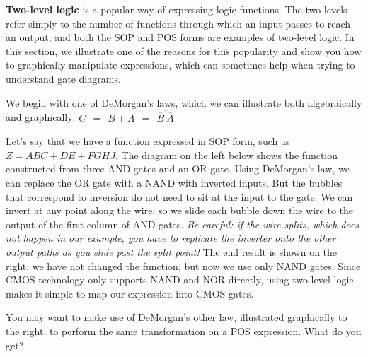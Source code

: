\begin{minipage}{5.3in}
{\bf Two-level logic} is a popular way of expressing logic functions.
The two levels refer simply to the number of functions through which an
input passes to reach an output, and both the SOP and POS forms are 
examples of two-level logic.  In this section, we illustrate one of the 
reasons for this popularity and 
show you how to graphically manipulate
expressions, which can sometimes help when trying to understand gate
diagrams.\mpline

We begin with one of DeMorgan's laws, which we can illustrate both 
algebraically and graphically:
$C~~=~~B+A~~=~~\overline{\overline{B}~\overline{A}}$
\end{minipage}\hspace{.25in}%
\begin{minipage}{0.95in}
\end{minipage}

\pagebreak

Let's say that we have a function expressed in SOP form, such as
$Z=ABC+DE+FGHJ$.  The diagram on the left below shows the function
constructed from three AND gates and an OR gate.  Using DeMorgan's
law, we can replace the OR gate with a NAND with inverted inputs.
But the bubbles that correspond to inversion do not need to sit at the
input to the gate.  We can invert at any point along the wire,
so we slide each bubble down the wire to the output of the first column
of AND gates.  {\em Be careful: if the wire splits, which does not
happen in our example, you have to replicate
the inverter onto the other output paths as you slide past the split
point!}  The end result is shown on the right: we have not changed the 
function, but now we use only NAND gates.  Since CMOS technology
only supports NAND and NOR directly, using two-level logic makes
it simple to map our expression into CMOS gates.


\begin{minipage}{5.3in}
You may want to make use of DeMorgan's other law, illustrated graphically
to the right, to perform the same transformation on a POS expression.  What
do you get?
\end{minipage}\hspace{.25in}%
\begin{minipage}{0.95in}
\end{minipage}\vspace{12pt}


